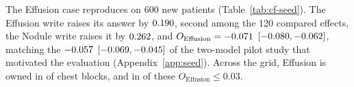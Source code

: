 \documentclass{article}
\providecommand{\DIFdelbeginFL}{} %
\providecommand{\DIFscaledelfig}{0.5}
\newlength{\DIFdelgraphicswidth} %
\newlength{\DIFdelgraphicsheight} %
\providecommand{\DIFdelincludegraphics}[2][]{%
\sbox{\DIFdelgraphicsbox}{\DIFOincludegraphics[#1]{#2}}%
\settoboxwidth{\DIFdelgraphicswidth}{\DIFdelgraphicsbox} %
\settoboxtotalheight{\DIFdelgraphicsheight}{\DIFdelgraphicsbox} %
\scalebox{\DIFscaledelfig}{%
\parbox[b]{\DIFdelgraphicswidth}{\usebox{\DIFdelgraphicsbox}\\[-\baselineskip] \rule{\DIFdelgraphicswidth}{0em}}\llap{\resizebox{\DIFdelgraphicswidth}{\DIFdelgraphicsheight}{%
\setlength{\unitlength}{\DIFdelgraphicswidth}%
\begin{picture}(1,1)%
\thicklines\linethickness{2pt} %
{\color[rgb]{1,0,0}\put(0,0){\framebox(1,1){}}}%
{\color[rgb]{1,0,0}\put(0,0){\line( 1,1){1}}}%
{\color[rgb]{1,0,0}\put(0,1){\line(1,-1){1}}}%
\end{picture}%
}\hspace*{3pt}}} %
} %
\DeclareRobustCommand{\DIFdelbeginFL}{\DIFOdelbeginFL \let\includegraphics\DIFdelincludegraphics} %
\begin{document}
\label{sec:seed}The Effusion case reproduces on 600 new patients (Table~\ref{tab:cf-seed}). The Effusion write raises its answer by $0.190$, second among the 120 compared effects, the Nodule write raises it by $0.262$, and $O_{\mathrm{Effusion}}=-0.071$ $[-0.080,-0.062]$, matching the $-0.057$ $[-0.069,-0.045]$ of the two-model pilot study that motivated the evaluation (Appendix~\ref{app:seed}). Across the grid, Effusion is owned in \cfEffusionOwnedBlocks{} of \cfChestBlocks{} chest blocks, and in \cfEffusionOwnedSmall{} of these $O_{\mathrm{Effusion}}\leq0.03$.

\begin{table}[t]
\centering
\setlength{\tabcolsep}{2pt}
\renewcommand{\arraystretch}{1.08}

\caption{\textbf{Reading, answering, and writing per checkpoint.} Per dataset: mean probe selectivity $S$ (\textsc{Read}), mean clean-answer AUROC (\textsc{Ans}), and mean ownership $O_q$ (\textsc{Own}), each superscripted with the number of the six concepts that receive the grade; then the owned share of clinical and COCO cells and their ratio, by which rows are sorted. Shading darkens with magnitude (blue for negative \textsc{Own}); ``--'' marks an undefined ratio.}
\label{tab:cf-main}
\DIFdelbeginFL %

\end{table}
\end{document}
